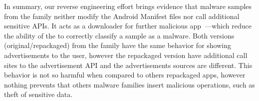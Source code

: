In summary, our reverse engineering effort brings evidence that malware samples from the \gps family neither modify the Android Manifest files nor call additional sensitive APIs. It acts as a
downloader for further malicious app~\cite{DBLP:conf/ndss/ArpSHGR14}---which reduce the ability of the \mas to correctly classify a sample as a malware. Both versions (original/repackaged) from the \gps family have the same behavior for showing advertisements to the user,
however the repackaged version have additional call sites to the advertisement API and the advertisements sources are different. This behavior is not so harmful when compared to others repackaged apps, however nothing prevents that others malware families insert malicious operations, such as theft of
sensitive data.




 








